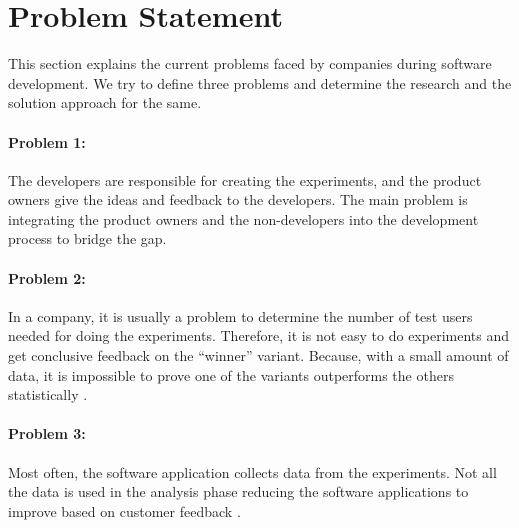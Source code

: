 \section{Problem Statement}
\label{intro:section:problems}
This section explains the current problems faced by companies during software development. We try to define three problems and determine the research and the solution approach for the same.

\paragraph{Problem 1:} The developers are responsible for creating the experiments, and the product owners give the ideas and feedback to the developers.
The main problem is integrating the product owners and the non-developers into the development process to bridge the gap.


\paragraph{Problem 2:} In a company, it is usually a problem to determine the number of test users needed for doing the experiments. 
Therefore, it is not easy to do experiments and get conclusive feedback on the ``winner'' variant. 
Because, with a small amount of data, it is impossible to prove one of the variants outperforms the others statistically \cite{article:usability:smalldata}.

\paragraph{Problem 3:} Most often, the software application collects data from the experiments. 
Not all the data is used in the analysis phase reducing the software applications to improve based on customer feedback \cite{article:datadrive:brian}.


